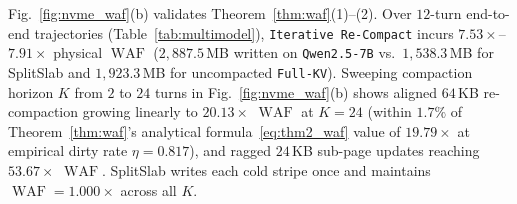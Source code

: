 \documentclass[final,5p,times,twocolumn]{elsarticle}
\theoremstyle{definition}
\theoremstyle{remark}
\newcommand{\SplitSlab}{\textup{\textsc{SplitSlab}}}
\newcommand{\WAF}{\operatorname{WAF}}
\def\SplitSlab{SplitSlab}%
\begin{document}
\begin{table}[!t]
\centering
\caption{Measured Apple M5 Pro $64$\,KB I/O vs.\ Analytical Datacenter $3$-Stripe ($192$\,KB) Overlap ($1{,}160\,\mu\mathrm{s}$ Conservative GPU Window)}
\label{tab:storage_tiers}
\renewcommand{\arraystretch}{1.10}
\setlength{\tabcolsep}{3.0pt}
\end{table}

Fig.~\ref{fig:nvme_waf}(b) validates Theorem~\ref{thm:waf}(1)--(2). Over $12$-turn end-to-end trajectories (Table~\ref{tab:multimodel}), \texttt{Iterative Re-Compact} incurs $7.53\times$--$7.91\times$ physical $\WAF$ ($2{,}887.5$\,MB written on \texttt{Qwen2.5-7B} vs.\ $1{,}538.3$\,MB for \SplitSlab{} and $1{,}923.3$\,MB for uncompacted \texttt{Full-KV}). Sweeping compaction horizon $K$ from $2$ to $24$ turns in Fig.~\ref{fig:nvme_waf}(b) shows aligned $64$\,KB re-compaction growing linearly to $20.13\times$ $\WAF$ at $K=24$ (within $1.7\%$ of Theorem~\ref{thm:waf}'s analytical formula~\eqref{eq:thm2_waf} value of $19.79\times$ at empirical dirty rate $\eta = 0.817$), and ragged $24$\,KB sub-page updates reaching $53.67\times$ $\WAF$. \SplitSlab{} writes each cold stripe once and maintains $\WAF = 1.000\times$ across all $K$.
\end{document}
